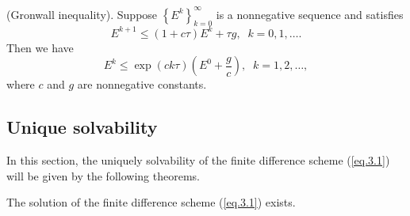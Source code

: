 \documentclass{siamart171218}
\numberwithin{theorem}{section}
\numberwithin{equation}{section}
\begin{document}
\begin{lemma}\label{Lem.3.10}(Gronwall inequality\cite{Holte2009}).
Suppose $\left\{E^k\right\}_{k=0}^\infty$ is a nonnegative sequence
and satisfies
\begin{equation*}
E^{k+1}\leq\left(1+c\tau\right)E^k+\tau g,\;\;k=0,1,\ldots.
\end{equation*}
Then we have
\begin{equation*}
E^{k}\leq\exp\left(ck\tau\right)\left(E^0+\frac{g}{c}\right),\;\;k=1,2,\ldots,
\end{equation*}
where $c$ and $g$ are nonnegative constants.
\end{lemma}

\subsection{Unique solvability}
In this section, the uniquely solvability of the finite difference scheme
(\ref{eq.3.1}) will be given by the following theorems.
\begin{theorem}\label{Th.3.10}
The solution of the finite difference scheme (\ref{eq.3.1}) exists.
\end{theorem}
\end{document}
